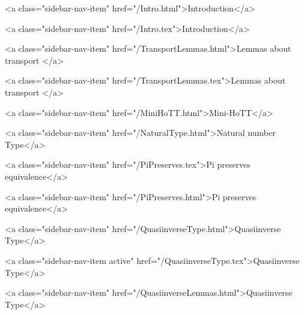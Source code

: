      
    
      
        
          <a class="sidebar-nav-item" href="/Intro.html">Introduction</a>
        
      
    
      
        
          <a class="sidebar-nav-item" href="/Intro.tex">Introduction</a>
        
      
    
      
        
          <a class="sidebar-nav-item" href="/TransportLemmas.html">Lemmas about transport </a>
        
      
    
      
        
          <a class="sidebar-nav-item" href="/TransportLemmas.tex">Lemmas about transport </a>
        
      
    
      
        
          <a class="sidebar-nav-item" href="/MiniHoTT.html">Mini-HoTT</a>
        
      
    
      
        
          <a class="sidebar-nav-item" href="/NaturalType.html">Natural number Type</a>
        
      
    
      
        
          <a class="sidebar-nav-item" href="/PiPreserves.tex">Pi preserves equivalence</a>
        
      
    
      
        
          <a class="sidebar-nav-item" href="/PiPreserves.html">Pi preserves equivalence</a>
        
      
    
      
        
          <a class="sidebar-nav-item" href="/QuasiinverseType.html">Quasiinverse Type</a>
        
      
    
      
        
          <a class="sidebar-nav-item active" href="/QuasiinverseType.tex">Quasiinverse Type</a>
        
      
    
      
        
          <a class="sidebar-nav-item" href="/QuasiinverseLemmas.html">Quasiinverse Type</a>
        
